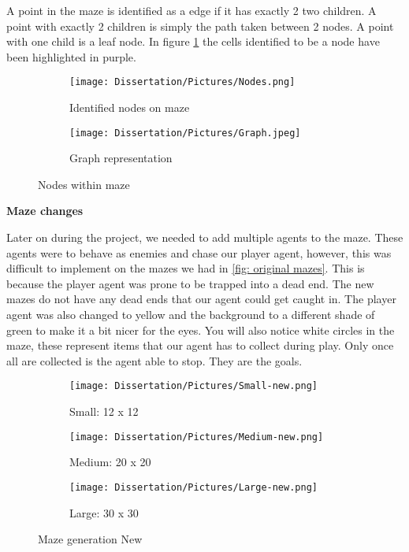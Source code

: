 \documentclass[]{final_report}
\begin{document}
A point in the maze is identified as a edge if it has exactly 2 two children. A point with exactly 2 children is simply the path taken between 2 nodes. A point with one child is a leaf node. In figure \ref{Nodes} the cells identified to be a node have been highlighted in purple.

\begin{figure}[h]
     \centering
     \begin{subfigure}[h]{0.45\textwidth}
         \centering
         \texttt{[image: Dissertation/Pictures/Nodes.png]}
         \caption{Identified nodes on maze}
     \end{subfigure}
     \hfill
     \begin{subfigure}[h]{0.45\textwidth}
         \centering
         \texttt{[image: Dissertation/Pictures/Graph.jpeg]}
         \caption{Graph representation}
     \end{subfigure}
     \caption{Nodes within maze}
     \label{Nodes}
\end{figure}

\textbf{Maze changes}

Later on during the project, we needed to add multiple agents to the maze. These agents were to behave as enemies and chase our player agent, however, this was difficult to implement on the mazes we had in \ref{fig: original mazes}. This is because the player agent was prone to be trapped into a dead end. The new mazes do not have any dead ends that our agent could get caught in. The player agent was also changed to yellow and the background to a different shade of green to make it a bit nicer for the eyes. You will also notice white circles in the maze, these represent items that our agent has to collect during play. Only once all are collected is the agent able to stop. They are the goals. 

\begin{figure}[!htp]
     \centering
     \begin{subfigure}[h]{0.3\textwidth}
         \centering
         \texttt{[image: Dissertation/Pictures/Small-new.png]}
         \caption{Small: 12 x 12}
     \end{subfigure}
     \hfill
     \begin{subfigure}[h]{0.3\textwidth}
         \centering
         \texttt{[image: Dissertation/Pictures/Medium-new.png]}         
         \caption{Medium: 20 x 20}
     \end{subfigure}
     \hfill
     \begin{subfigure}[h]{0.3\textwidth}
         \centering
         \texttt{[image: Dissertation/Pictures/Large-new.png]}
         \caption{Large: 30 x 30}
     \end{subfigure}
     \caption{Maze generation New}
\end{figure}
\end{document}
